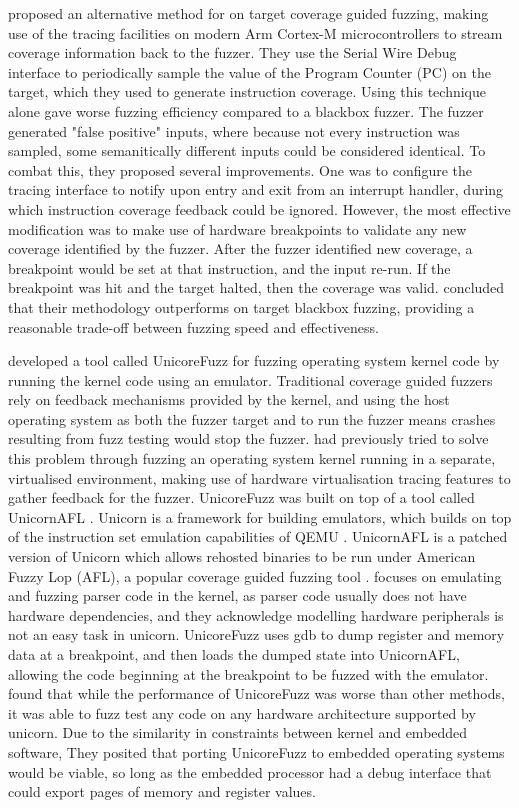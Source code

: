 \documentclass[../report.tex]{subfiles}
\begin{document}
\citet{Beckmann_2023} proposed an alternative method for on target coverage
guided fuzzing, making use of the tracing facilities on modern Arm Cortex-M
microcontrollers to stream coverage information back to the fuzzer. They use
the Serial Wire Debug interface to periodically sample the value of the Program
Counter (PC) on the target, which they used to generate instruction coverage.
Using this technique alone gave worse fuzzing efficiency compared to a blackbox
fuzzer. The fuzzer generated "false positive" inputs, where because not every
instruction was sampled, some semanitically different inputs could be
considered identical. To combat this, they proposed several improvements. One
was to configure the tracing interface to notify upon entry and exit from an
interrupt handler, during which instruction coverage feedback could be ignored.
However, the most effective modification was to make use of hardware
breakpoints to validate any new coverage identified by the fuzzer. After the
fuzzer identified new coverage, a breakpoint would be set at that instruction,
and the input re-run. If the breakpoint was hit and the target halted, then the
coverage was valid. \citet{Becmann_2023} concluded that their methodology
outperforms on target blackbox fuzzing, providing a reasonable trade-off
between fuzzing speed and effectiveness.

\citet{Maier_2019} developed a tool called UnicoreFuzz for fuzzing operating
system kernel code by running the kernel code using an emulator. Traditional
coverage guided fuzzers rely on feedback mechanisms provided by the kernel, and
using the host operating system as both the fuzzer target and to run the fuzzer
means crashes resulting from fuzz testing would stop the fuzzer.
\citet{kAFL_2017} had previously tried to solve this problem through fuzzing an
operating system kernel running in a separate, virtualised environment, making
use of hardware virtualisation tracing features to gather feedback for the
fuzzer. UnicoreFuzz was built on top of a tool called UnicornAFL
\citep{Maier_2019}. Unicorn is a framework for building emulators, which builds
on top of the instruction set emulation capabilities of QEMU \citep{Unicorn}.
UnicornAFL is a patched version of Unicorn which allows rehosted binaries to be
run under American Fuzzy Lop (AFL), a popular coverage guided fuzzing tool
\citep{UnicornMode, AFL_2019}.
\citet{Maier_2019} focuses on emulating and fuzzing parser code in the kernel,
as parser code usually does not have hardware dependencies, and they
acknowledge modelling hardware peripherals is not an easy task in unicorn.
UnicoreFuzz uses gdb to dump register and memory data at a breakpoint, and then
loads the dumped state into UnicornAFL, allowing the code beginning at the
breakpoint to be fuzzed with the emulator. \citet{Maier_2019} found that while
the performance of UnicoreFuzz was worse than other methods, it was able to
fuzz test any code on any hardware architecture supported by unicorn. Due to
the similarity in constraints between kernel and embedded software, They
posited that porting UnicoreFuzz to embedded operating systems would be viable,
so long as the embedded processor had a debug interface that could export pages
of memory and register values.
\end{document}
